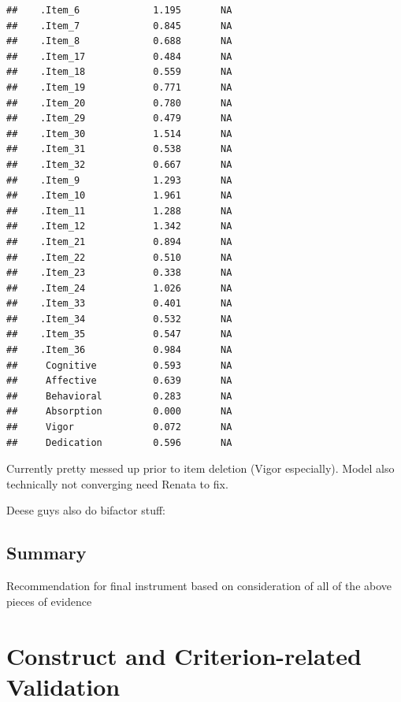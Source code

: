 \documentclass[
]{book}
\begin{document}
\begin{verbatim}
##    .Item_6             1.195       NA                  
##    .Item_7             0.845       NA                  
##    .Item_8             0.688       NA                  
##    .Item_17            0.484       NA                  
##    .Item_18            0.559       NA                  
##    .Item_19            0.771       NA                  
##    .Item_20            0.780       NA                  
##    .Item_29            0.479       NA                  
##    .Item_30            1.514       NA                  
##    .Item_31            0.538       NA                  
##    .Item_32            0.667       NA                  
##    .Item_9             1.293       NA                  
##    .Item_10            1.961       NA                  
##    .Item_11            1.288       NA                  
##    .Item_12            1.342       NA                  
##    .Item_21            0.894       NA                  
##    .Item_22            0.510       NA                  
##    .Item_23            0.338       NA                  
##    .Item_24            1.026       NA                  
##    .Item_33            0.401       NA                  
##    .Item_34            0.532       NA                  
##    .Item_35            0.547       NA                  
##    .Item_36            0.984       NA                  
##     Cognitive          0.593       NA                  
##     Affective          0.639       NA                  
##     Behavioral         0.283       NA                  
##     Absorption         0.000       NA                  
##     Vigor              0.072       NA                  
##     Dedication         0.596       NA
\end{verbatim}

Currently pretty messed up prior to item deletion (Vigor especially). Model also technically not converging need Renata to fix.

Deese guys also do bifactor stuff: \citet{mansolf_when_2017}

\hypertarget{summary}{%
\subsection{Summary}\label{summary}}

Recommendation for final instrument based on consideration of all of the above pieces of evidence

\hypertarget{construct-and-criterion-related-validation}{%
\section{Construct and Criterion-related Validation}\label{construct-and-criterion-related-validation}}
\end{document}
